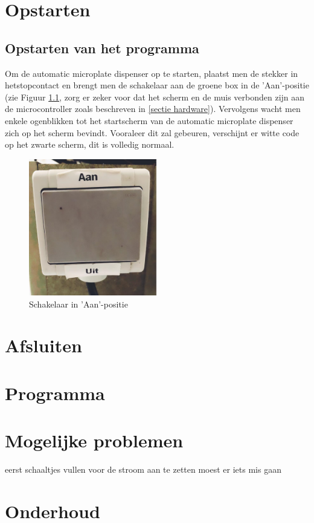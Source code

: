 \documentclass[A4]{kulakreport}
\begin{document}
\chapter{Opstarten}
\section{Opstarten van het programma}
Om de automatic microplate dispenser op te starten, plaatst men de stekker in hetstopcontact en brengt men de schakelaar aan de groene box in de 'Aan'-positie (zie Figuur \ref{fig:schakelaar}, zorg er zeker voor dat het scherm en de muis verbonden zijn aan de microcontroller zoals beschreven in \ref{sectie hardware}). Vervolgens wacht men enkele ogenblikken tot het startscherm van de automatic microplate dispenser zich op het scherm bevindt. Vooraleer dit zal gebeuren, verschijnt er witte code op het zwarte scherm, dit is volledig normaal. 

\begin{figure}[h]
	\centering
	\includegraphics[width=0.5\textwidth]{schakelaar.png}
	\caption{Schakelaar in 'Aan'-positie}
	\label{fig:schakelaar}
	
\end{figure} 



\chapter{Afsluiten}

\chapter{Programma}

\chapter{Mogelijke problemen}
eerst schaaltjes vullen voor de stroom aan te zetten moest er iets mis gaan

\chapter{Onderhoud}
\end{document}
